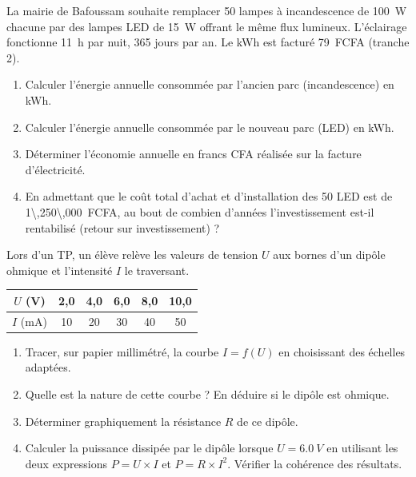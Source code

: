 \documentclass[11pt]{article}
\begin{document}
\begin{exercice}
La mairie de Bafoussam souhaite remplacer \num{50} lampes à incandescence de \SI{100}{W} chacune par des lampes LED de \SI{15}{W} offrant le même flux lumineux. L'éclairage fonctionne \SI{11}{h} par nuit, \num{365} jours par an. Le kWh est facturé \SI{79}{FCFA} (tranche 2).
\begin{enumerate}
    \item Calculer l'énergie annuelle consommée par l'ancien parc (incandescence) en \si{kWh}.
    \item Calculer l'énergie annuelle consommée par le nouveau parc (LED) en \si{kWh}.
    \item Déterminer l'économie annuelle en francs CFA réalisée sur la facture d'électricité.
    \item En admettant que le coût total d'achat et d'installation des 50 LED est de \SI{1\,250\,000}{FCFA}, au bout de combien d'années l'investissement est-il rentabilisé (retour sur investissement) ?
\end{enumerate}
\end{exercice}

\begin{exercice}
Lors d'un TP, un élève relève les valeurs de tension $U$ aux bornes d'un dipôle ohmique et l'intensité $I$ le traversant.
\begin{center}
\begin{tabular}{|c|c|c|c|c|c|}
\hline
$U$ (\si{V}) & 2,0 & 4,0 & 6,0 & 8,0 & 10,0 \\
\hline
$I$ (\si{mA}) & 10 & 20 & 30 & 40 & 50 \\
\hline
\end{tabular}
\end{center}
\begin{enumerate}
    \item Tracer, sur papier millimétré, la courbe $I = f(U)$ en choisissant des échelles adaptées.
    \item Quelle est la nature de cette courbe ? En déduire si le dipôle est ohmique.
    \item Déterminer graphiquement la résistance $R$ de ce dipôle.
    \item Calculer la puissance dissipée par le dipôle lorsque $U = \SI{6,0}{V}$ en utilisant les deux expressions $P = U \times I$ et $P = R \times I^2$. Vérifier la cohérence des résultats.
\end{enumerate}
\end{exercice}
\end{document}
